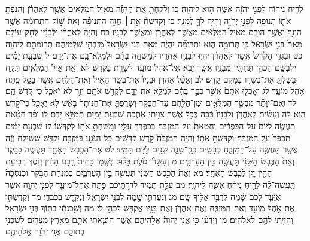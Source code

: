 \documentclass[twoside, openany, parskip=half, 11pt]{book}
\begin{document}
לְרֵ֤יחַ נִיח֙וֹחַ֙ לִפְנֵ֣י יְהֹוָ֔ה אִשֶּׁ֥ה ה֖וּא לַיהֹוָֽה׃ כו וְלָקַחְתָּ֣ אֶת־הֶֽחָזֶ֗ה מֵאֵ֤יל הַמִּלֻּאִים֙ אֲשֶׁ֣ר לְאַהֲרֹ֔ן וְהֵנַפְתָּ֥ אֹת֛וֹ תְּנוּפָ֖ה לִפְנֵ֣י יְהֹוָ֑ה וְהָיָ֥ה לְךָ֖ לְמָנָֽה׃ כז וְקִדַּשְׁתָּ֞ אֵ֣ת ׀ חֲזֵ֣ה הַתְּנוּפָ֗ה וְאֵת֙ שׁ֣וֹק הַתְּרוּמָ֔ה אֲשֶׁ֥ר הוּנַ֖ף וַאֲשֶׁ֣ר הוּרָ֑ם מֵאֵיל֙ הַמִּלֻּאִ֔ים מֵאֲשֶׁ֥ר לְאַהֲרֹ֖ן וּמֵאֲשֶׁ֥ר לְבָנָֽיו׃ כח וְהָיָה֩ לְאַהֲרֹ֨ן וּלְבָנָ֜יו לְחׇק־עוֹלָ֗ם מֵאֵת֙ בְּנֵ֣י יִשְׂרָאֵ֔ל כִּ֥י תְרוּמָ֖ה ה֑וּא וּתְרוּמָ֞ה יִהְיֶ֨ה מֵאֵ֤ת בְּנֵֽי־יִשְׂרָאֵל֙ מִזִּבְחֵ֣י שַׁלְמֵיהֶ֔ם תְּרוּמָתָ֖ם לַיהֹוָֽה׃ כט וּבִגְדֵ֤י הַקֹּ֙דֶשׁ֙ אֲשֶׁ֣ר לְאַהֲרֹ֔ן יִהְי֥וּ לְבָנָ֖יו אַחֲרָ֑יו לְמׇשְׁחָ֣ה בָהֶ֔ם וּלְמַלֵּא־בָ֖ם אֶת־יָדָֽם׃ ל שִׁבְעַ֣ת יָמִ֗ים יִלְבָּשָׁ֧ם הַכֹּהֵ֛ן תַּחְתָּ֖יו מִבָּנָ֑יו אֲשֶׁ֥ר יָבֹ֛א אֶל־אֹ֥הֶל מוֹעֵ֖ד לְשָׁרֵ֥ת בַּקֹּֽדֶשׁ׃ לא וְאֵ֛ת אֵ֥יל הַמִּלֻּאִ֖ים תִּקָּ֑ח וּבִשַּׁלְתָּ֥ אֶת־בְּשָׂר֖וֹ בְּמָקֹ֥ם קָדֹֽשׁ׃ לב וְאָכַ֨ל אַהֲרֹ֤ן וּבָנָיו֙ אֶת־בְּשַׂ֣ר הָאַ֔יִל וְאֶת־הַלֶּ֖חֶם אֲשֶׁ֣ר בַּסָּ֑ל פֶּ֖תַח אֹ֥הֶל מוֹעֵֽד׃ לג וְאָכְל֤וּ אֹתָם֙ אֲשֶׁ֣ר כֻּפַּ֣ר בָּהֶ֔ם לְמַלֵּ֥א אֶת־יָדָ֖ם לְקַדֵּ֣שׁ אֹתָ֑ם וְזָ֥ר לֹא־יֹאכַ֖ל כִּי־קֹ֥דֶשׁ הֵֽם׃ לד וְֽאִם־יִוָּתֵ֞ר מִבְּשַׂ֧ר הַמִּלֻּאִ֛ים וּמִן־הַלֶּ֖חֶם עַד־הַבֹּ֑קֶר וְשָׂרַפְתָּ֤ אֶת־הַנּוֹתָר֙ בָּאֵ֔שׁ לֹ֥א יֵאָכֵ֖ל כִּי־קֹ֥דֶשׁ הֽוּא׃ לה וְעָשִׂ֜יתָ לְאַהֲרֹ֤ן וּלְבָנָיו֙ כָּ֔כָה כְּכֹ֥ל אֲשֶׁר־צִוִּ֖יתִי אֹתָ֑כָה שִׁבְעַ֥ת יָמִ֖ים תְּמַלֵּ֥א יָדָֽם׃ לו וּפַ֨ר חַטָּ֜את תַּעֲשֶׂ֤ה לַיּוֹם֙ עַל־הַכִּפֻּרִ֔ים וְחִטֵּאתָ֙ עַל־הַמִּזְבֵּ֔חַ בְּכַפֶּרְךָ֖ עָלָ֑יו וּמָֽשַׁחְתָּ֥ אֹת֖וֹ לְקַדְּשֽׁוֹ׃ לז שִׁבְעַ֣ת יָמִ֗ים תְּכַפֵּר֙ עַל־הַמִּזְבֵּ֔חַ וְקִדַּשְׁתָּ֖ אֹת֑וֹ וְהָיָ֤ה הַמִּזְבֵּ֙חַ֙ קֹ֣דֶשׁ קׇֽדָשִׁ֔ים כׇּל־הַנֹּגֵ֥עַ בַּמִּזְבֵּ֖חַ יִקְדָּֽשׁ׃
ששילח וְזֶ֕ה אֲשֶׁ֥ר תַּעֲשֶׂ֖ה עַל־הַמִּזְבֵּ֑חַ כְּבָשִׂ֧ים בְּנֵֽי־שָׁנָ֛ה שְׁנַ֥יִם לַיּ֖וֹם תָּמִֽיד׃ לט אֶת־הַכֶּ֥בֶשׂ הָאֶחָ֖ד תַּעֲשֶׂ֣ה בַבֹּ֑קֶר וְאֵת֙ הַכֶּ֣בֶשׂ הַשֵּׁנִ֔י תַּעֲשֶׂ֖ה בֵּ֥ין הָעַרְבָּֽיִם׃ מ וְעִשָּׂרֹ֨ן סֹ֜לֶת בָּל֨וּל בְּשֶׁ֤מֶן כָּתִית֙ רֶ֣בַע הַהִ֔ין וְנֵ֕סֶךְ רְבִיעִ֥ת הַהִ֖ין יָ֑יִן לַכֶּ֖בֶשׂ הָאֶחָֽד׃ מא וְאֵת֙ הַכֶּ֣בֶשׂ הַשֵּׁנִ֔י תַּעֲשֶׂ֖ה בֵּ֣ין הָעַרְבָּ֑יִם כְּמִנְחַ֨ת הַבֹּ֤קֶר וּכְנִסְכָּהּ֙ תַּֽעֲשֶׂה־לָּ֔הּ לְרֵ֣יחַ נִיחֹ֔חַ אִשֶּׁ֖ה לַיהֹוָֽה׃ מב עֹלַ֤ת תָּמִיד֙ לְדֹרֹ֣תֵיכֶ֔ם פֶּ֥תַח אֹֽהֶל־מוֹעֵ֖ד לִפְנֵ֣י יְהֹוָ֑ה אֲשֶׁ֨ר אִוָּעֵ֤ד לָכֶם֙ שָׁ֔מָּה לְדַבֵּ֥ר אֵלֶ֖יךָ שָֽׁם׃ מג וְנֹעַדְתִּ֥י שָׁ֖מָּה לִבְנֵ֣י יִשְׂרָאֵ֑ל וְנִקְדַּ֖שׁ בִּכְבֹדִֽי׃ מד וְקִדַּשְׁתִּ֛י אֶת־אֹ֥הֶל מוֹעֵ֖ד וְאֶת־הַמִּזְבֵּ֑חַ וְאֶת־אַהֲרֹ֧ן וְאֶת־בָּנָ֛יו אֲקַדֵּ֖שׁ לְכַהֵ֥ן לִֽי׃ מה וְשָׁ֣כַנְתִּ֔י בְּת֖וֹךְ בְּנֵ֣י יִשְׂרָאֵ֑ל וְהָיִ֥יתִי לָהֶ֖ם לֵאלֹהִֽים׃ מו וְיָדְע֗וּ כִּ֣י אֲנִ֤י יְהֹוָה֙ אֱלֹ֣הֵיהֶ֔ם אֲשֶׁ֨ר הוֹצֵ֧אתִי אֹתָ֛ם מֵאֶ֥רֶץ מִצְרַ֖יִם לְשׇׁכְנִ֣י בְתוֹכָ֑ם אֲנִ֖י יְהֹוָ֥ה אֱלֹהֵיהֶֽם׃
\end{document}
